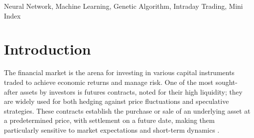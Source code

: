 \documentclass[conference]{IEEEtran}
\begin{document}
\maketitle
\begin{abstract}
This article investigates short-term trend forecasting in the mini-index futures market using a hybrid framework that integrates technical analysis, feature selection, and evolutionary hyperparameter optimization. Five-minute intraday data obtained from the BovDBV2 database are used to construct a set of technical indicators that capture short-term price dynamics. To address the redundancy and noise commonly found in high-dimensional financial data, a feature selection method is applied to reduce the original feature space to a compact and informative subset. Genetic algorithms are then employed to optimize the hyperparameters of three supervised learning models: Random Forest, Support Vector Machine, and Multilayer Perceptron.

Experimental results indicate that genetic algorithm optimization consistently improves model performance when compared to a baseline Random Forest model without hyperparameter tuning, which achieved an accuracy of approximately 61.63\%. Within the proposed framework, the optimized Support Vector Machine and Multilayer Perceptron models reach test accuracies of 65.61\% and 65.85\%, respectively, while maintaining balanced $F1-scores$ across uptrend and downtrend classes. These results demonstrate the effectiveness of combining feature selection with evolutionary hyperparameter optimization for short-term financial time series forecasting in derivatives markets.
\end{abstract}

\begin{IEEEkeywords}
Neural Network, Machine Learning, Genetic Algorithm, Intraday Trading, Mini Index
\end{IEEEkeywords}



\section{Introduction}

The financial market is the arena for investing in various capital instruments traded to achieve economic returns and manage risk. One of the most sought-after assets by investors is futures contracts, noted for their high liquidity; they are widely used for both hedging against price fluctuations and speculative strategies. These contracts establish the purchase or sale of an underlying asset at a predetermined price, with settlement on a future date, making them particularly sensitive to market expectations and short-term dynamics \cite{jarrow1981forward}.
\end{document}
